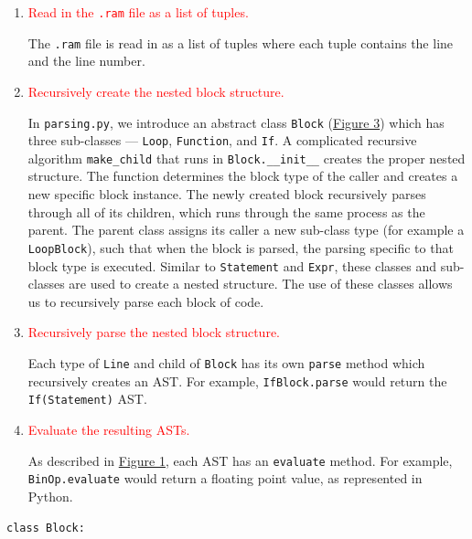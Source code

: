 \documentclass[11pt]{article}
\begin{document}
\begin{enumerate}
    \item \textcolor{red}{Read in the \texttt{.ram} file as a list of tuples.}
    
    The \texttt{.ram} file is read in as a list of tuples where each tuple contains the line and the line number. 
    
    \item \textcolor{red}{Recursively create the nested block structure.} \hypertarget{step2}{}
    
    In \texttt{parsing.py}, we introduce an abstract class \texttt{Block} (\hyperlink{fig3}{Figure 3}) which has three sub-classes --- \texttt{Loop}, \texttt{Function}, and \texttt{If}. A complicated recursive algorithm \texttt{make\_child} that runs in \texttt{Block.\_\_init\_\_} creates the proper nested structure. The function determines the block type of the caller and creates a new specific block instance. The newly created block recursively parses through all of its children, which runs through the same process as the parent. The parent class assigns its caller a new sub-class type (for example a \texttt{LoopBlock}), such that when the block is parsed, the parsing specific to that block type is executed. Similar to \texttt{Statement} and \texttt{Expr}, these classes and sub-classes are used to create a nested structure. The use of these classes allows us to recursively parse each block of code. 
    
    \item \textcolor{red}{Recursively parse the nested block structure.}
    
     Each type of \texttt{Line} and child of \texttt{Block} has its own \texttt{parse} method which recursively creates an AST. For example, \texttt{IfBlock.parse} would return the \texttt{If(Statement)} AST.
    
    \item \textcolor{red}{Evaluate the resulting ASTs.}
    
    As described in \hyperlink{fig1}{Figure 1}, each AST has an \texttt{evaluate} method. For example, \texttt{BinOp.evaluate} would return a floating point value, as represented in Python.
    
\end{enumerate}

\bigskip

\hypertarget{fig3}{}
    
\quad \texttt{\textcolor{keywordred}{class} \textcolor{keywordorange}{Block}:}
    
\end{document}
